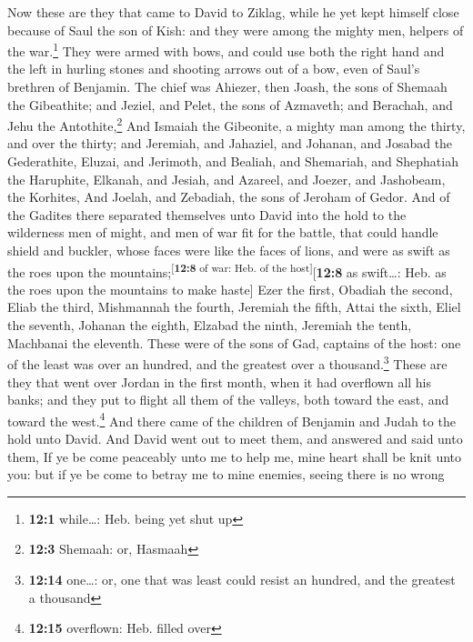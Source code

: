  Now these are they that came to David to Ziklag, while he
yet kept himself close because of Saul the son of Kish: and they were
among the mighty men, helpers of the war.\footnote{\textbf{12:1}
  while\ldots: Heb. being yet shut up}  They were armed
with bows, and could use both the right hand and the left in hurling
stones and shooting arrows out of a bow, even of Saul's brethren of
Benjamin.  The chief was Ahiezer, then Joash, the sons of
Shemaah the Gibeathite; and Jeziel, and Pelet, the sons of Azmaveth; and
Berachah, and Jehu the Antothite,\footnote{\textbf{12:3} Shemaah: or,
  Hasmaah}  And Ismaiah the Gibeonite, a mighty man among
the thirty, and over the thirty; and Jeremiah, and Jahaziel, and
Johanan, and Josabad the Gederathite,  Eluzai, and
Jerimoth, and Bealiah, and Shemariah, and Shephatiah the Haruphite,
 Elkanah, and Jesiah, and Azareel, and Joezer, and
Jashobeam, the Korhites,  And Joelah, and Zebadiah, the
sons of Jeroham of Gedor.  And of the Gadites there
separated themselves unto David into the hold to the wilderness men of
might, and men of war fit for the battle, that could handle shield and
buckler, whose faces were like the faces of lions, and were as swift as
the roes upon the mountains;\textsuperscript{{[}\textbf{12:8} of war:
Heb. of the host{]}}{[}\textbf{12:8} as swift\ldots: Heb. as the roes
upon the mountains to make haste{]}  Ezer the first,
Obadiah the second, Eliab the third,  Mishmannah the
fourth, Jeremiah the fifth,  Attai the sixth, Eliel the
seventh,  Johanan the eighth, Elzabad the ninth,
 Jeremiah the tenth, Machbanai the eleventh.
 These were of the sons of Gad, captains of the host: one
of the least was over an hundred, and the greatest over a
thousand.\footnote{\textbf{12:14} one\ldots: or, one that was least
  could resist an hundred, and the greatest a thousand} 
These are they that went over Jordan in the first month, when it had
overflown all his banks; and they put to flight all them of the valleys,
both toward the east, and toward the west.\footnote{\textbf{12:15}
  overflown: Heb. filled over}  And there came of the
children of Benjamin and Judah to the hold unto David. 
And David went out to meet them, and answered and said unto them, If ye
be come peaceably unto me to help me, mine heart shall be knit unto you:
but if ye be come to betray me to mine enemies, seeing there is no wrong

